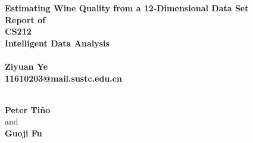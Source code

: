 \documentclass[titlepage,a4paper,12pt,thmsb]{report}
\begin{document}
\begin{titlepage}
\thispagestyle{empty}
\begin{center}
{\LARGE \bf{ Estimating Wine Quality from a 12-Dimensional
Data Set}} \\
\vspace{2.0cm}
\large \bf{ Report of } \\
\large \bf{CS212\\ Intelligent Data Analysis} \\
\vspace{0.3cm}
\large {} \\
\vspace{0.3cm}
\rm
{\large \bf {Ziyuan Ye}}\\
\vspace{0.5cm}
\bf{11610203@mail.sustc.edu.cn} \\

\vspace{1cm}

{\large{}} \\

\hspace{.05cm} {\bf {Peter Ti\v{n}o}}\\
\hspace{.05cm} {\sc and}\\
\hspace{.05cm} {\bf {Guoji Fu}}\\


\end{center}
\end{titlepage}
\end{document}
